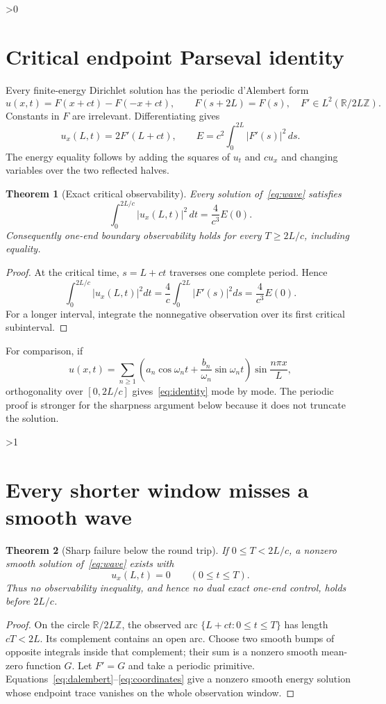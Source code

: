 \documentclass[10pt]{article}
\providecommand{\CRevisionRound}{2}
\newtheorem{theorem}{Theorem}
\newcommand{\R}{\mathbb R}
\begin{document}
\ifnum\CRevisionRound>0
\section{Critical endpoint Parseval identity}
Every finite-energy Dirichlet solution has the periodic d'Alembert form
\begin{equation}\label{eq:dalembert}
 u(x,t)=F(x+ct)-F(-x+ct),\qquad F(s+2L)=F(s),\quad F'\in L^2(\R/2L\mathbb Z).
\end{equation}
Constants in $F$ are irrelevant.  Differentiating gives
\begin{equation}\label{eq:coordinates}
 u_x(L,t)=2F'(L+ct),\qquad
 E=c^2\int_0^{2L}|F'(s)|^2\,ds.
\end{equation}
The energy equality follows by adding the squares of $u_t$ and $cu_x$ and
changing variables over the two reflected halves.

\begin{theorem}[Exact critical observability]\label{thm:identity}
Every solution of~\eqref{eq:wave} satisfies
\begin{equation}\label{eq:identity}
 \int_0^{2L/c}|u_x(L,t)|^2\,dt=\frac4{c^3}E(0).
\end{equation}
Consequently one-end boundary observability holds for every
$T\ge2L/c$, including equality.
\end{theorem}
\begin{proof}
At the critical time, $s=L+ct$ traverses one complete period.  Hence
\[
 \int_0^{2L/c}|u_x(L,t)|^2dt
 =\frac4c\int_0^{2L}|F'(s)|^2ds=\frac4{c^3}E(0).
\]
For a longer interval, integrate the nonnegative observation over its first
critical subinterval.
\end{proof}

For comparison, if
\[
 u(x,t)=\sum_{n\ge1}\left(a_n\cos\omega_nt+\frac{b_n}{\omega_n}
 \sin\omega_nt\right)\sin\frac{n\pi x}{L},
\]
orthogonality over $[0,2L/c]$ gives~\eqref{eq:identity} mode by mode.  The
periodic proof is stronger for the sharpness argument below because it does
not truncate the solution.
\fi

\ifnum\CRevisionRound>1
\section{Every shorter window misses a smooth wave}
\begin{theorem}[Sharp failure below the round trip]\label{thm:sharp}
If $0\le T<2L/c$, a nonzero smooth solution of~\eqref{eq:wave} exists with
\[
 u_x(L,t)=0\qquad(0\le t\le T).
\]
Thus no observability inequality, and hence no dual exact one-end control,
holds before $2L/c$.
\end{theorem}
\begin{proof}
On the circle $\R/2L\mathbb Z$, the observed arc
$\{L+ct:0\le t\le T\}$ has length $cT<2L$.  Its complement contains an open
arc.  Choose two smooth bumps of opposite integrals inside that complement;
their sum is a nonzero smooth mean-zero function $G$.  Let $F'=G$ and take a
periodic primitive.  Equations~\eqref{eq:dalembert}--\eqref{eq:coordinates}
give a nonzero smooth energy solution whose endpoint trace vanishes on the
whole observation window.
\end{proof}
\end{document}

